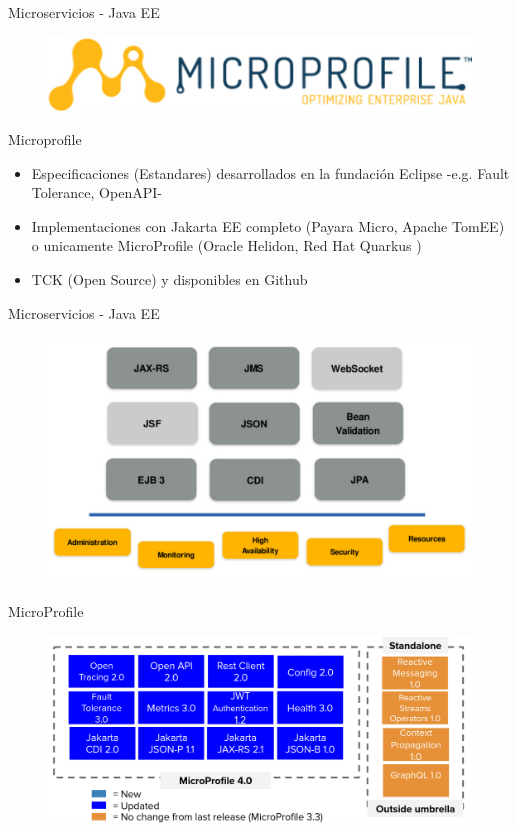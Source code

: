 \documentclass[aspectratio=169]{beamer}
\begin{document}
\begin{frame}{Microservicios - Java EE}
\begin{figure}
	\centering
	\includegraphics[width=0.9\linewidth]{Images/microprofile-logo}
\end{figure}
\end{frame}

\begin{frame}{Microprofile}
\begin{itemize}
\item Especificaciones (Estandares) desarrollados en la fundación Eclipse -e.g. Fault Tolerance, OpenAPI-
\item Implementaciones con Jakarta EE completo (Payara Micro, Apache TomEE) o unicamente MicroProfile (Oracle Helidon, Red Hat Quarkus )
\item TCK (Open Source) y disponibles en Github
\end{itemize}
\end{frame}

\begin{frame}{Microservicios - Java EE}
\begin{figure}
	\centering
	\includegraphics[width=\linewidth]{Images/javaeemicropancake}
\end{figure}
\end{frame}

\begin{frame}{MicroProfile}
\begin{figure}
	\centering
	\includegraphics[width=\linewidth]{Images/microprofile}
\end{figure}
\end{frame}
\end{document}
